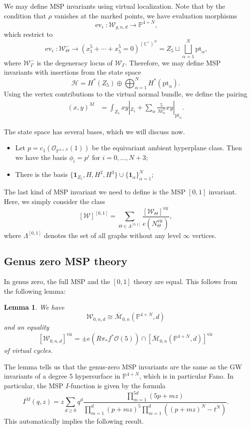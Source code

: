 \documentclass[10pt,oldfontcommands,oneside]{memoir}
\newtheorem{lem}[thm]{Lemma}
\theoremstyle{definition}
\theoremstyle{remark}
\theoremstyle{plain}
\theoremstyle{definition}
\theoremstyle{remark}
\newcommand{\C}{\mathbb{C}}
\renewcommand{\P}{\mathbb{P}}
\newcommand{\Mbar}{\overline{\mathcal{M}}}
\newcommand{\mc}[1]{\mathcal{#1}}
\newcommand{\mr}[1]{\mathrm{#1}}
\newcommand{\1}{\mathbf{1}}
\newcommand{\2}{\mathbf{2}}
\newcommand{\3}{\mathbf{3}}
\newcommand{\vir}{\mr{vir}}
\newcommand{\pt}{\mr{pt}}
\DeclareMathOperator{\ev}{ev}
\begin{document}
We may define MSP invariants using virtual localization. Note that by the condition that $\rho$ vanishes at the marked points, we have evaluation morphisms
\[ \ev_i \colon \mc{W}_{g,n,d} \to \P^{4+N}, \]
which restrict to
\[ \ev_i \colon \mc{W}_{\Theta}^- \to (x_1^5 + \cdots + x_5^5 = 0)^{(\C^{\times})^N} = Z_5 \sqcup \bigsqcup_{\alpha=1}^N \pt_{\alpha}, \]
where $\mc{W}^-_{\Gamma}$ is the degeneracy locus of $\mc{W}_{\Gamma}$. Therefore, we may define MSP invariants with insertions from the state space
\[ \mc{H} = H^*(Z_5) \oplus \bigoplus_{\alpha=1}^N H^*(\pt_{\alpha}). \]
Using the vertex contributions to the virtual normal bundle, we define the pairing
\begin{align*}
    (x,y)^M &= \int_{Z_5} xy|_{ Z_5 } + \sum_{\alpha} \frac{5}{N t_{\alpha}^3} xy |_{\pt_{\alpha}}.
\end{align*}

The state space has several bases, which we will discuss now.
\begin{itemize}
    \item Let $p = c_1(\mc{O}_{\P^{4+N}}(1))$ be the equivariant ambient hyperplane class. Then we have the basis $\phi_i = p^i$ for $i=0,\ldots, N+3$;
    \item There is the basis $\{ \1_{Z_5},H,H^2,H^3 \}\cup \{ \1_{\alpha} \}_{\alpha=1}^N$;
\end{itemize}

The last kind of MSP invariant we need to define is the MSP $[0,1]$ invariant. Here, we simply consider the class
\[ [\mc{W}]^{[0,1]} = \sum_{\Theta \in \Lambda^{[0,1]}} \frac{[\mc{W}_{\Theta}]^{\vir}}{e(N_{\Theta}^{\vir})}, \]
where $\Lambda^{[0,1]}$ denotes the set of all graphs without any level $\infty$ vertices.

\subsection{Genus zero MSP theory}%
\label{sub:Genus zero MSP theory}

In genus zero, the full MSP and the $[0,1]$ theory are equal. This follows from the following lemma:
\begin{lem}
    We have
    \[ \mc{W}_{0,n,d} \cong \Mbar_{0,n}(\P^{4+N}, d) \]
    and an equality
    \[ [\mc{W}_{0,n,d}]^{\vir} = \pm e(R\pi_* f^* \mc{O}(5)) \cap [\Mbar_{0,n}(\P^{4+N},d)]^{\vir} \]
    of virtual cycles.
\end{lem}
The lemma tells us that the genus-zero MSP invariants are the same as the GW invariants of a degree $5$ hypersurface in $\P^{4+N}$, which is in particular Fano. In particular,
the MSP $I$-function is given by the formula
\[ I^M(q,z) = z \sum_{d \geq 0} q^d \frac{\prod_{m=1}^{5d} (5p+mz)}{\prod_{m=1}^d (p+mz)^5 \prod_{m=1}^d ((p+mz)^N - t^N)}. \]
This automatically implies the following result.
\end{document}
